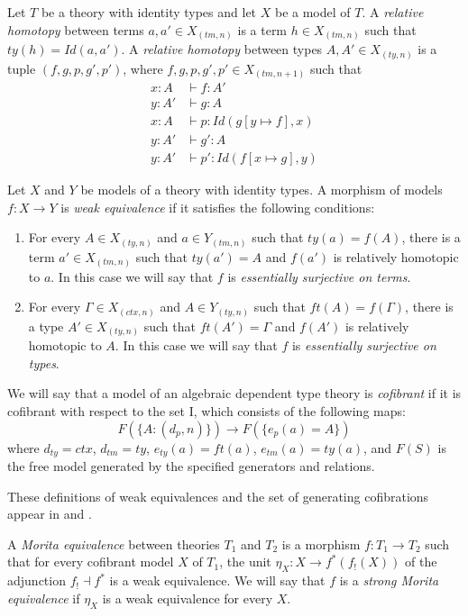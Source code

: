 \documentclass[reqno]{amsart}
\theoremstyle{definition}
\theoremstyle{remark}
\newcommand{\I}{\mathrm{I}}
\numberwithin{figure}{section}
\begin{document}
Let $T$ be a theory with identity types and let $X$ be a model of $T$.
A \emph{relative homotopy} between terms $a,a' \in X_{(tm,n)}$ is a term $h \in X_{(tm,n)}$ such that $ty(h) = Id(a,a')$.
A \emph{relative homotopy} between types $A,A' \in X_{(ty,n)}$ is a tuple $(f,g,p,g',p')$, where $f,g,p,g',p' \in X_{(tm,n+1)}$ such that
\begin{align*}
x : A & \vdash f : A' \\
y : A' & \vdash g : A \\
x : A & \vdash p : Id(g[y \mapsto f], x) \\
y : A' & \vdash g' : A \\
y : A' & \vdash p' : Id(f[x \mapsto g], y)
\end{align*}

Let $X$ and $Y$ be models of a theory with identity types.
A morphism of models $f : X \to Y$ is \emph{weak equivalence} if it satisfies the following conditions:
\begin{enumerate}
\item For every $A \in X_{(ty,n)}$ and $a \in Y_{(tm,n)}$ such that $ty(a) = f(A)$,
there is a term $a' \in X_{(tm,n)}$ such that $ty(a') = A$ and $f(a')$ is relatively homotopic to $a$.
In this case we will say that $f$ is \emph{essentially surjective on terms}.
\item For every $\Gamma \in X_{(ctx,n)}$ and $A \in Y_{(ty,n)}$ such that $ft(A) = f(\Gamma)$,
there is a type $A' \in X_{(ty,n)}$ such that $ft(A') = \Gamma$ and $f(A')$ is relatively homotopic to $A$.
In this case we will say that $f$ is \emph{essentially surjective on types}.
\end{enumerate}

We will say that a model of an algebraic dependent type theory is \emph{cofibrant} if it is cofibrant with respect to the set $\I$, which consists of the following maps:
\[ F(\{ A : (d_p,n) \}) \to F(\{ e_p(a) = A \}) \]
where $d_{ty} = ctx$, $d_{tm} = ty$, $e_{ty}(a) = ft(a)$, $e_{tm}(a) = ty(a)$,
and $F(S)$ is the free model generated by the specified generators and relations.

These definitions of weak equivalences and the set of generating cofibrations appear in \cite{alg-models} and \cite{kap-lum-model}.

\begin{defn}
A \emph{Morita equivalence} between theories $T_1$ and $T_2$ is a morphism $f : T_1 \to T_2$ such that for every cofibrant model $X$ of $T_1$,
the unit $\eta_X : X \to f^*(f_!(X))$ of the adjunction $f_! \dashv f^*$ is a weak equivalence.
We will say that $f$ is a \emph{strong Morita equivalence} if $\eta_X$ is a weak equivalence for every $X$.
\end{defn}
\end{document}
